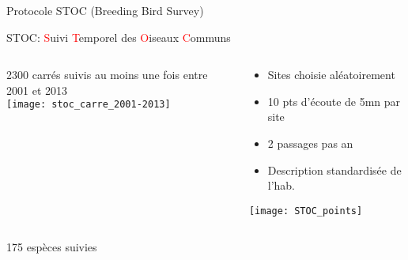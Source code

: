 \documentclass[]{beamer}
\begin{document}
\begin{frame}{Protocole STOC (Breeding Bird Survey)}
    \begin{center}
      STOC: \textcolor{red}{S}uivi \textcolor{red}{T}emporel des \textcolor{red}{O}iseaux \textcolor{red}{C}ommuns
  \end{center}
 \begin{columns}[c]
    \begin{column}[c]{0.5\textwidth}
      \begin{center}
      2300 carrés suivis au moins une fois entre 2001 et 2013 \\
    \texttt{[image: stoc\_carre\_2001-2013]}
      \end{center}
    \end{column}
    \begin{column}[c]{0.5\textwidth}
    \begin{small}
      \begin{itemize}
      \item  Sites choisie aléatoirement
    \item 10 pts d'écoute de 5mn par site
    \item 2 passages pas an
    \item Description standardisée de l'hab.
    \end{itemize}
    \end{small}
     \begin{center}
       \texttt{[image: STOC\_points]}
  \end{center}
    \end{column}
  \end{columns}
 \begin{center}
  175 espèces suivies
  \end{center}
\end{frame}
\end{document}
